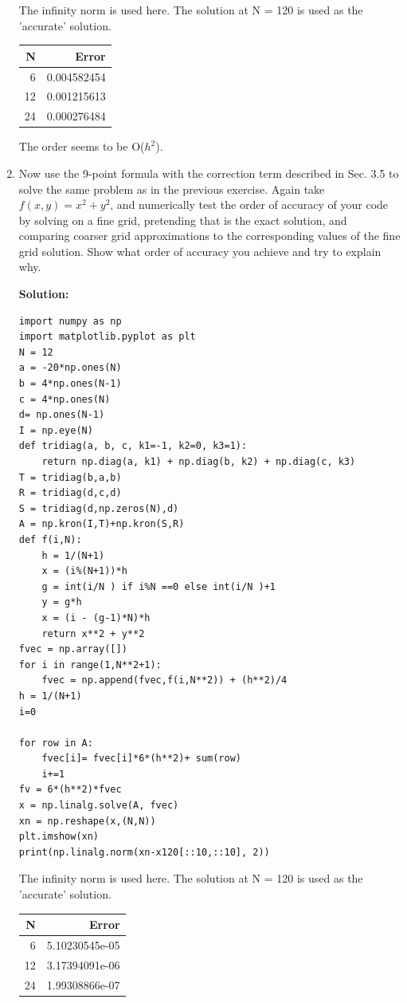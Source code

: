 \documentclass[letterpaper,12pt]{article}
\begin{document}
\begin{enumerate}
\begin{lstlisting}[style=myPythonstyle]
\end{lstlisting}


The infinity norm is used here. The solution at N = 120 is used as the 'accurate' solution.

\begin{tabular}{rr}
\hline
    N &      Error \\
\hline
 6  & 0.004582454\\
 12 & 0.001215613 \\
 24 & 0.000276484  \\
\hline
\end{tabular} 

The order seems to be O($h^2$).

\item
Now use the 9-point formula with the correction term described in Sec. 3.5 to solve
the same problem as in the previous exercise.
Again take $f(x,y) = x^2 + y^2$, and numerically test the order of accuracy of your code
by solving on a fine grid, pretending that is the exact solution, and comparing 
coarser grid approximations to the corresponding values of the fine grid solution.
Show what order of accuracy you achieve and try to explain why.

{\bf Solution:}

	\begin{lstlisting}[style=myPythonstyle]
import numpy as np
import matplotlib.pyplot as plt
N = 12
a = -20*np.ones(N)
b = 4*np.ones(N-1)
c = 4*np.ones(N)
d= np.ones(N-1)
I = np.eye(N)
def tridiag(a, b, c, k1=-1, k2=0, k3=1):
    return np.diag(a, k1) + np.diag(b, k2) + np.diag(c, k3)
T = tridiag(b,a,b)
R = tridiag(d,c,d)
S = tridiag(d,np.zeros(N),d)
A = np.kron(I,T)+np.kron(S,R)
def f(i,N):
    h = 1/(N+1) 
    x = (i%(N+1))*h
    g = int(i/N ) if i%N ==0 else int(i/N )+1
    y = g*h
    x = (i - (g-1)*N)*h
    return x**2 + y**2
fvec = np.array([])
for i in range(1,N**2+1):
    fvec = np.append(fvec,f(i,N**2)) + (h**2)/4
h = 1/(N+1) 
i=0

for row in A:
    fvec[i]= fvec[i]*6*(h**2)+ sum(row)
    i+=1
fv = 6*(h**2)*fvec
x = np.linalg.solve(A, fvec)
xn = np.reshape(x,(N,N))
plt.imshow(xn)
print(np.linalg.norm(xn-x120[::10,::10], 2))

\end{lstlisting}

The infinity norm is used here. The solution at N = 120 is used as the 'accurate' solution.

\begin{tabular}{rr}
\hline
    N &      Error \\
\hline
 6  & 5.10230545e-05\\
 12 & 3.17394091e-06 \\
 24 & 1.99308866e-07  \\
\hline
\end{tabular} 


\end{enumerate}
\end{document}
